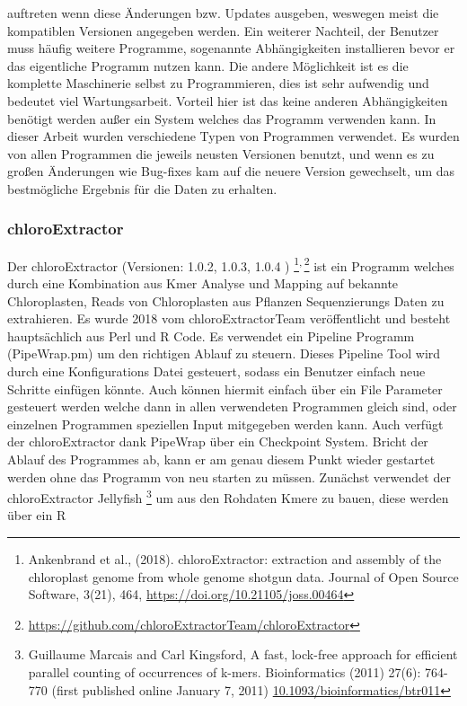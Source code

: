\documentclass{scrartcl}
\begin{document}
auftreten wenn diese Änderungen bzw. Updates ausgeben, weswegen meist die kompatiblen Versionen angegeben werden. Ein weiterer Nachteil, der Benutzer muss häufig weitere Programme, sogenannte Abhängigkeiten installieren
bevor er das eigentliche Programm nutzen kann. Die andere Möglichkeit ist es die komplette Maschinerie selbst zu Programmieren, dies ist sehr aufwendig und bedeutet viel Wartungsarbeit. Vorteil hier
ist das keine anderen Abhängigkeiten benötigt werden außer ein System welches das Programm verwenden kann. In dieser Arbeit wurden verschiedene Typen von Programmen verwendet.
Es wurden von allen Programmen die jeweils neusten Versionen benutzt, und wenn es zu großen Änderungen wie Bug-fixes kam auf die neuere Version gewechselt, um das bestmögliche Ergebnis für die Daten
zu erhalten.
\subsubsection{chloroExtractor}
\label{sec-2-5-1}
Der chloroExtractor (Versionen: 1.0.2, 1.0.3, 1.0.4 ) \footnote{Ankenbrand et al., (2018). chloroExtractor: extraction and assembly of the chloroplast genome from whole genome shotgun data. Journal of Open Source Software, 3(21), 464, \url{https://doi.org/10.21105/joss.00464}}\textsuperscript{,}\,\footnote{\url{https://github.com/chloroExtractorTeam/chloroExtractor}} ist ein Programm welches durch eine Kombination aus Kmer Analyse und Mapping auf bekannte Chloroplasten, Reads von Chloroplasten aus Pflanzen Sequenzierungs Daten
zu extrahieren. Es wurde 2018 vom chloroExtractorTeam veröffentlicht \footnotemark[9]{} und besteht hauptsächlich aus Perl und R Code. Es verwendet ein Pipeline Programm (PipeWrap.pm) um den richtigen Ablauf zu steuern.
Dieses Pipeline Tool wird durch eine Konfigurations Datei gesteuert, sodass ein Benutzer einfach neue Schritte einfügen könnte. Auch können hiermit einfach über ein File Parameter gesteuert werden welche dann in 
allen verwendeten Programmen gleich sind, oder einzelnen Programmen speziellen Input mitgegeben werden kann. Auch verfügt der chloroExtractor dank PipeWrap über ein Checkpoint System. Bricht der Ablauf des Programmes
ab, kann er am genau diesem Punkt wieder gestartet werden ohne das Programm von neu starten zu müssen. Zunächst verwendet der chloroExtractor Jellyfish \footnote{Guillaume Marcais and Carl Kingsford, A fast, lock-free approach for efficient parallel counting of occurrences of k-mers. Bioinformatics (2011) 27(6): 764-770 (first published online January 7, 2011) \url{10.1093/bioinformatics/btr011}} um aus den Rohdaten Kmere zu bauen, diese werden über ein R
\end{document}
